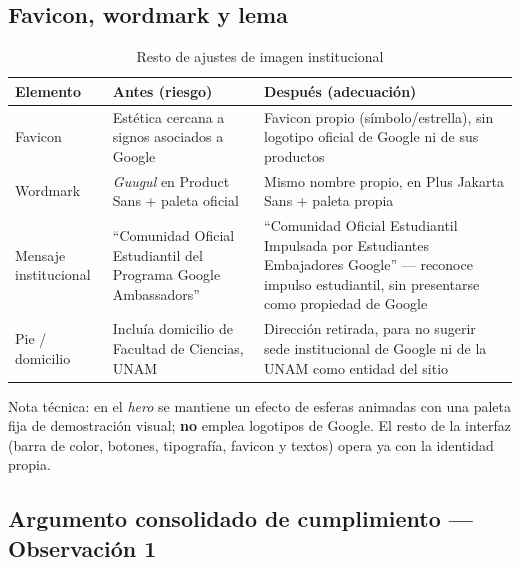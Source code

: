 \documentclass[11pt,a4paper]{article}
\begin{document}
\subsection{Favicon, wordmark y lema}

\begin{table}[h]
\centering
\caption{Resto de ajustes de imagen institucional}
\begin{tabular}{@{}p{3.2cm}p{5.4cm}p{5.2cm}@{}}
\toprule
\textbf{Elemento} & \textbf{Antes (riesgo)} & \textbf{Después (adecuación)} \\
\midrule
Favicon & Estética cercana a signos asociados a Google & Favicon propio (símbolo/estrella), sin logotipo oficial de Google ni de sus productos \\
\addlinespace
Wordmark & \emph{Guugul} en Product Sans + paleta oficial & Mismo nombre propio, en Plus Jakarta Sans + paleta propia \\
\addlinespace
Mensaje institucional & \enquote{Comunidad Oficial Estudiantil del Programa Google Ambassadors} & \enquote{Comunidad Oficial Estudiantil Impulsada por Estudiantes Embajadores Google} --- reconoce impulso estudiantil, sin presentarse como propiedad de Google \\
\addlinespace
Pie / domicilio & Incluía domicilio de Facultad de Ciencias, UNAM & Dirección retirada, para no sugerir sede institucional de Google ni de la UNAM como entidad del sitio \\
\bottomrule
\end{tabular}
\end{table}

Nota técnica: en el \emph{hero} se mantiene un efecto de esferas animadas con una paleta fija de demostración visual; \textbf{no} emplea logotipos de Google. El resto de la interfaz (barra de color, botones, tipografía, favicon y textos) opera ya con la identidad propia.

\subsection{Argumento consolidado de cumplimiento --- Observación 1}
\end{document}

